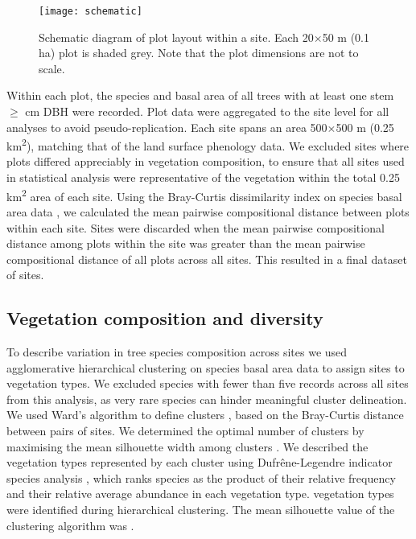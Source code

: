\documentclass[11pt,a4paper]{article}
\begin{document}
\begin{figure}[H]
\centering
	\texttt{[image: schematic]}
	\caption{Schematic diagram of plot layout within a site. Each 20$\times$50
		m (0.1 ha) plot is shaded grey. Note that the plot dimensions are not to
		scale.}
	\label{schematic}
\end{figure}

Within each plot, the species and basal area of all trees with at least one
stem $\geq$\stemSize{} cm DBH were recorded. Plot data were aggregated to the
site level for all analyses to avoid pseudo-replication. Each site spans an
area 500$\times$500 m (0.25 km\textsuperscript{2}), matching that of the land
surface phenology data. We excluded sites where plots differed appreciably in
vegetation composition, to ensure that all sites used in statistical analysis
were representative of the vegetation within the total 0.25
km\textsuperscript{2} area of each site. Using the Bray-Curtis dissimilarity
index on species basal area data \citep{Faith1987}, we calculated the mean
pairwise compositional distance between plots within each site. Sites were
discarded when the mean pairwise compositional distance among plots within the
site was greater than the mean pairwise compositional distance of all plots
across all sites. This resulted in a final dataset of \plotDistN{} sites.

\subsection{Vegetation composition and diversity} 

To describe variation in tree species composition across sites we used
agglomerative hierarchical clustering on species basal area data
\citep{Kreft2010, Fayolle2014} to assign sites to vegetation types. We excluded
species with fewer than five records across all sites from this analysis, as
very rare species can hinder meaningful cluster delineation. We used Ward's
algorithm to define clusters \citep{Murtagh2014}, based on the Bray-Curtis
distance between pairs of sites. We determined the optimal number of clusters
by maximising the mean silhouette width among clusters \citep{Rousseeuw1987}.
We described the vegetation types represented by each cluster using
Dufr\^{e}ne-Legendre indicator species analysis \citep{Dufrene1997}, which
ranks species as the product of their relative frequency and their relative
average abundance in each vegetation type. \Numberstringnum{\nCluster}
vegetation types were identified during hierarchical clustering. The mean
silhouette value of the clustering algorithm was \silBest{}. 
\end{document}
